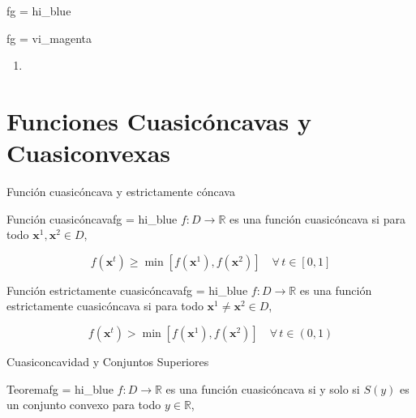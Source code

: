 \begin{frame}{}
	

\end{frame}


%
\begin{varblock}{}{fg = hi_blue}
	  
\end{varblock}

%
\begin{varblock}{}{fg = vi_magenta}
	  
\end{varblock}

%
\begin{alertblock}{}

\end{alertblock}

%
\begin{exampleblock}{}

\end{exampleblock}

\begin{enumerate}[label=(\alph*)]
    \item 
\end{enumerate}






\section{Funciones Cuasicóncavas y Cuasiconvexas}

\begin{frame}{Función cuasicóncava y estrictamente cóncava}

	\begin{varblock}{Función cuasicóncava}{fg = hi_blue}
		$f: D \rightarrow \mathbb{R}$ es una función cuasicóncava si para todo $\mathbf{x}^1, \mathbf{x}^2 \in D$,
		
		\[ f(\mathbf{x}^t) \geq  \min [f(\mathbf{x}^1), f(\mathbf{x}^2)]   \quad   \forall \, t \in [0,1] \]
	\end{varblock}

	\begin{varblock}{Función estrictamente cuasicóncava}{fg = hi_blue}
		$f: D \rightarrow \mathbb{R}$ es una función estrictamente cuasicóncava si para todo $\mathbf{x}^1 \neq  \mathbf{x}^2 \in D$,
		
		\[ f(\mathbf{x}^t) > \min [f(\mathbf{x}^1), f(\mathbf{x}^2)]   \quad   \forall \, t \in (0,1) \]
	\end{varblock}

\end{frame}

\begin{frame}{Cuasiconcavidad y Conjuntos Superiores}

	\begin{varblock}{Teorema}{fg = hi_blue}
		$f: D \rightarrow \mathbb{R}$ es una función cuasicóncava si y solo si $S(y)$ es un conjunto convexo
		para todo $y \in \mathbb{R}$,
	\end{varblock}

\end{frame}


